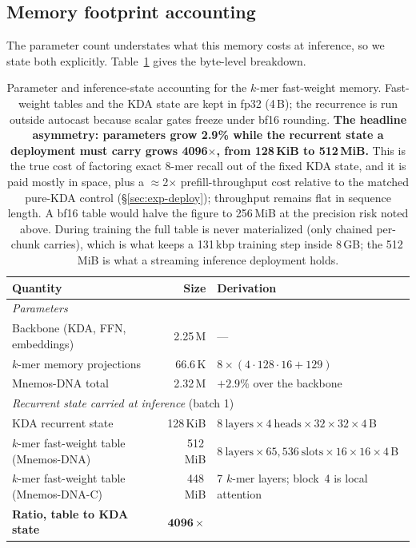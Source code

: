\documentclass[11pt]{article}
\theoremstyle{plain}
\begin{document}
\subsection{Memory footprint accounting}\label{sec:method-footprint}

The parameter count understates what this memory costs at inference, so we state both explicitly.
Table~\ref{tab:footprint} gives the byte-level breakdown.

\begin{table}[!tbp]
\centering\small
\begin{tabular}{lrl}
\toprule
Quantity & Size & Derivation \\
\midrule
\multicolumn{3}{l}{\emph{Parameters}} \\
Backbone (KDA, FFN, embeddings) & 2.25\,M & --- \\
$k$-mer memory projections & 66.6\,K & $8 \times (4{\cdot}128{\cdot}16 + 129)$ \\
Mnemos-DNA total & 2.32\,M & $+2.9\%$ over the backbone \\
\midrule
\multicolumn{3}{l}{\emph{Recurrent state carried at inference} (batch 1)} \\
KDA recurrent state & 128\,KiB & $8\ \text{layers}\times4\ \text{heads}\times32{\times}32\times4$\,B \\
$k$-mer fast-weight table (Mnemos-DNA) & 512\,MiB & $8\ \text{layers}\times65{,}536\ \text{slots}\times16{\times}16\times4$\,B \\
$k$-mer fast-weight table (Mnemos-DNA-C) & 448\,MiB & 7 $k$-mer layers; block~4 is local attention \\
\textbf{Ratio, table to KDA state} & $\mathbf{4096\times}$ & \\
\bottomrule
\end{tabular}
\caption{Parameter and inference-state accounting for the $k$-mer fast-weight memory. Fast-weight
tables and the KDA state are kept in fp32 (4\,B); the recurrence is run outside autocast because
scalar gates freeze under bf16 rounding. \textbf{The headline asymmetry: parameters grow 2.9\%
while the recurrent state a deployment must carry grows 4096$\times$, from 128\,KiB to 512\,MiB.}
This is the true cost of factoring exact 8-mer recall out of the fixed KDA state, and it is
paid mostly in space, plus a $\approx$2$\times$ prefill-throughput cost relative to the matched
pure-KDA control (\S\ref{sec:exp-deploy}); throughput remains flat in sequence length. A bf16 table
would halve the figure to 256\,MiB at the precision risk noted above. During training the full
table is never materialized (only chained per-chunk carries), which is what keeps a 131\,kbp
training step inside 8\,GB; the 512\,MiB is what a streaming inference deployment holds.}
\label{tab:footprint}
\end{table}
\end{document}
